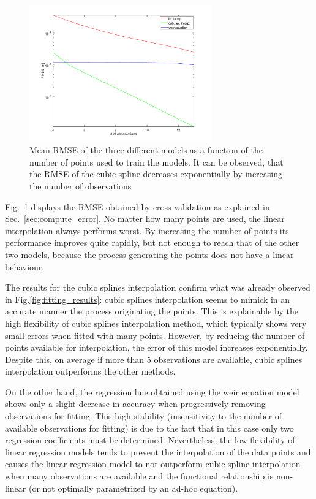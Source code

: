\begin{figure}[h]
  \centering
  \includegraphics[width=0.7\textwidth]{Figures/fitting_errors.png}
  \caption{Mean RMSE of the three different models as a function of the number of points used to train the models. It can be observed, that the RMSE of the cubic spline decreases exponentially by increasing the number of observations}
  \label{fig:fitting_errors}
\end{figure}

Fig.~\ref{fig:fitting_errors} displays the RMSE obtained by cross-validation as explained in Sec.~\ref{sec:compute_error}.
No matter how many points are used, the linear interpolation always performs worst.
By increasing the number of points its performance improves quite rapidly, but not enough to reach that of the other two models, because the process generating the points does not have a linear behaviour.
 
The results for the cubic splines interpolation confirm what was already observed in Fig.\ref{fig:fitting_results}:  cubic splines interpolation seems to mimick in an accurate manner the process originating the points.  This is explainable by the high flexibility of cubic splines interpolation method, which typically shows very small errors when fitted with many points. However, by reducing the number of points available for interpolation, the error of this model increases exponentially. Despite this, on average if more than 5 observations are available, cubic splines interpolation outperforms the other methods.

On the other hand, the regression line obtained using the weir equation model shows only a slight decrease in accuracy when progressively removing observations for fitting. This high stability (insensitivity to the number of available observations for fitting) is due to the fact that in this case only two regression coefficients must be determined. Nevertheless, the low flexibility of linear regression models tends to prevent the interpolation of the data points and causes the linear regression model to not outperform cubic spline interpolation when many observations are available and the functional relationship is non-linear (or not optimally parametrized by an ad-hoc equation).  

